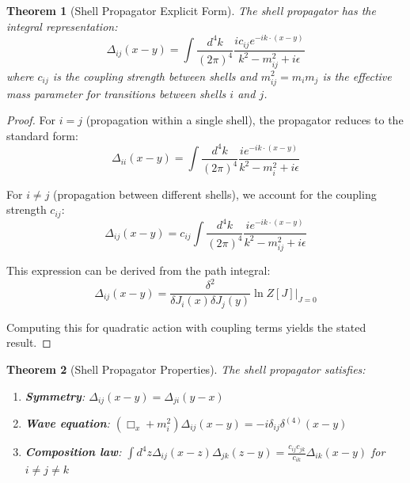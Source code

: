 \documentclass[12pt,a4paper]{article}
\newtheorem{theorem}{Theorem}[section]
\begin{document}
\begin{theorem}[Shell Propagator Explicit Form]
\label{thm:shell-propagator-form}
The shell propagator has the integral representation:
\begin{equation}
\Delta_{ij}(x-y) = \int \frac{d^4k}{(2\pi)^4} \frac{ic_{ij}e^{-ik \cdot (x-y)}}{k^2 - m_{ij}^2 + i\epsilon}
\end{equation}
where $c_{ij}$ is the coupling strength between shells and $m_{ij}^2 = m_i m_j$ is the effective mass parameter for transitions between shells $i$ and $j$.
\end{theorem}

\begin{proof}
For $i = j$ (propagation within a single shell), the propagator reduces to the standard form:
\begin{equation}
\Delta_{ii}(x-y) = \int \frac{d^4k}{(2\pi)^4} \frac{ie^{-ik \cdot (x-y)}}{k^2 - m_i^2 + i\epsilon}
\end{equation}

For $i \neq j$ (propagation between different shells), we account for the coupling strength $c_{ij}$:
\begin{equation}
\Delta_{ij}(x-y) = c_{ij} \int \frac{d^4k}{(2\pi)^4} \frac{ie^{-ik \cdot (x-y)}}{k^2 - m_{ij}^2 + i\epsilon}
\end{equation}

This expression can be derived from the path integral:
\begin{equation}
\Delta_{ij}(x-y) = \frac{\delta^2}{\delta J_i(x) \delta J_j(y)} \ln Z[J]\bigg|_{J=0}
\end{equation}

Computing this for quadratic action with coupling terms yields the stated result.
\end{proof}

\begin{theorem}[Shell Propagator Properties]
\label{thm:shell-propagator-properties}
The shell propagator satisfies:
\begin{enumerate}
    \item \textbf{Symmetry}: $\Delta_{ij}(x-y) = \Delta_{ji}(y-x)$
    \item \textbf{Wave equation}: $(\Box_x + m_i^2)\Delta_{ij}(x-y) = -i\delta_{ij}\delta^{(4)}(x-y)$
    \item \textbf{Composition law}: $\int d^4z \Delta_{ij}(x-z)\Delta_{jk}(z-y) = \frac{c_{ij}c_{jk}}{c_{ik}}\Delta_{ik}(x-y)$ for $i \neq j \neq k$
\end{enumerate}
\end{theorem}
\end{document}
